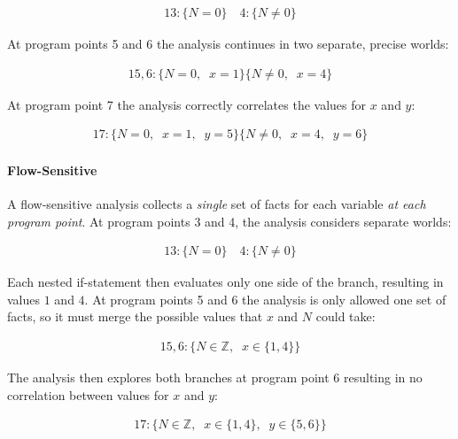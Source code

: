 \small\begin{alignat*}{1}
3 \mathbin{\colon}   \{ N=0 \}  \quad 4 \mathbin{\colon}   \{ N \neq 0 \} 
\end{alignat*}\normalsize

At program points 5 and 6 the analysis continues in two separate,
precise worlds:

\small\begin{alignat*}{1}
5,6 \mathbin{\colon}   \{ N=0 ,\;\;  x=1 \}   \{ N \neq 0 ,\;\;  x=4 \} 
\end{alignat*}\normalsize

At program point 7 the analysis correctly correlates the values for $x$
and $y$:

\small\begin{alignat*}{1}
7 \mathbin{\colon}   \{ N=0 ,\;\;  x=1 ,\;\;  y=5 \}   \{ N \neq 0 ,\;\;  x=4 ,\;\;  y=6 \} 
\end{alignat*}\normalsize

\par

\paragraph{Flow-Sensitive}

A flow-sensitive analysis collects a \emph{single} set of facts for each
variable \emph{at each program point}. At program points 3 and 4, the
analysis considers separate worlds:

\small\begin{alignat*}{1}
3 \mathbin{\colon}   \{ N=0 \}  \quad 4 \mathbin{\colon}   \{ N \neq 0 \} 
\end{alignat*}\normalsize

Each nested if-statement then evaluates only one side of the branch,
resulting in values $1$ and $4$. At program points 5 and 6 the analysis
is only allowed one set of facts, so it must merge the possible values
that $x$ and $N$ could take:

\small\begin{alignat*}{1}
5,6 \mathbin{\colon}   \{ N \in  \mathbb{Z}  ,\;\;  x \in  \{ 1,4 \}  \} 
\end{alignat*}\normalsize

The analysis then explores both branches at program point 6 resulting in
no correlation between values for $x$ and $y$:

\small\begin{alignat*}{1}
7 \mathbin{\colon}   \{ N \in  \mathbb{Z}  ,\;\;  x \in  \{ 1,4 \}  ,\;\;  y \in  \{ 5,6 \}  \} 
\end{alignat*}\normalsize

